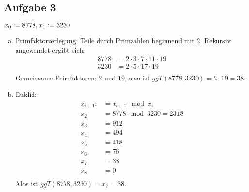 \subsection*{Aufgabe 3}
$x_0 := 8778, x_1 := 3230 \\$
\begin{enumerate}[a)]
  \item Primfaktorzerlegung:
  Teile durch Primzahlen beginnend mit 2. Rekursiv angewendet ergibt sich:
\begin{align*}
8778 &= 2 \cdot 3 \cdot 7 \cdot 11 \cdot 19 \\
3230 &= 2 \cdot 5 \cdot 17 \cdot 19 \\
\end{align*}
Gemeinsame Primfaktoren: $2$ und $19$, also ist $ggT(8778, 3230) = 2 \cdot 19 = 38$.
  \item Euklid:
\begin{align*}
x_{i+1} :&= x_{i-1} \mod x_i \\
x_2 &= 8778 \mod 3230 = 2318 \\
x_3 &= 912 \\
x_4 &= 494 \\
x_5 &= 418 \\
x_6 &= 76 \\
x_7 &= 38 \\
x_8 &= 0 \\
\end{align*}
Alos ist $ggT(8778, 3230) = x_7 = 38$.
\end{enumerate}


